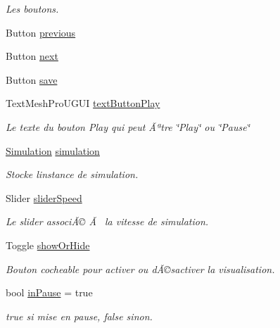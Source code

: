 \begin{DoxyCompactItemize}
\begin{DoxyCompactList}\small\item\em Les boutons. \end{DoxyCompactList}\item 
Button \mbox{\hyperlink{class_menu_visualization_u_i_a3f9110eee26214a3b05f68c10d878558}{previous}}
\item 
Button \mbox{\hyperlink{class_menu_visualization_u_i_a9a01852c63692dc3e56138a7d583b124}{next}}
\item 
Button \mbox{\hyperlink{class_menu_visualization_u_i_aca66441fb827fa1ce3402a0a3c0b9483}{save}}
\item 
Text\+Mesh\+Pro\+U\+G\+UI \mbox{\hyperlink{class_menu_visualization_u_i_aff6c8da4a2af320451a956a18e4e891b}{text\+Button\+Play}}
\begin{DoxyCompactList}\small\item\em Le texte du bouton Play qui peut Ãªtre \char`\"{}\+Play\char`\"{} ou \char`\"{}\+Pause\char`\"{} \end{DoxyCompactList}\item 
\mbox{\hyperlink{class_simulation}{Simulation}} \mbox{\hyperlink{class_menu_visualization_u_i_afa6725a6bef7e1c90a66a28485a241b3}{simulation}}
\begin{DoxyCompactList}\small\item\em Stocke l\textquotesingle{}instance de simulation. \end{DoxyCompactList}\item 
Slider \mbox{\hyperlink{class_menu_visualization_u_i_a91d9a2a50167c5d57b7df5ad88cc48a9}{slider\+Speed}}
\begin{DoxyCompactList}\small\item\em Le slider associÃ© Ã  la vitesse de simulation. \end{DoxyCompactList}\item 
Toggle \mbox{\hyperlink{class_menu_visualization_u_i_a76465e77e095aa0edd97d7dba183402e}{show\+Or\+Hide}}
\begin{DoxyCompactList}\small\item\em Bouton cocheable pour activer ou dÃ©sactiver la visualisation. \end{DoxyCompactList}\item 
bool \mbox{\hyperlink{class_menu_visualization_u_i_a401c5d14618bf08e1c50e20509d2b0e7}{in\+Pause}} = true
\begin{DoxyCompactList}\small\item\em true si mise en pause, false sinon. \end{DoxyCompactList}\item 

\end{DoxyCompactItemize}
